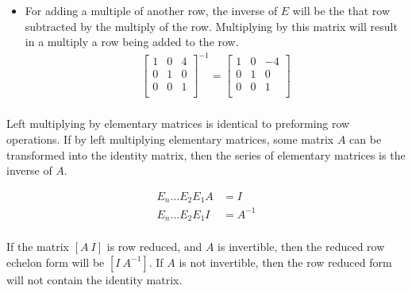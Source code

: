 \documentclass{article}
\theoremstyle{mytheoremstyle}
\theoremstyle{mytheoremstyle}
\theoremstyle{myproblemstyle}
\begin{document}
\begin{itemize}
        \item For adding a multiple of another row, the inverse of $E$ will be
            the that row subtracted by the multiply of the row. Multiplying by
            this matrix will result in a multiply a row being added to the row.
            \begin{align*}
                \begin{bmatrix}
                    1 & 0 & 4 \\
                    0 & 1 & 0 \\
                    0 & 0 & 1 \\
                \end{bmatrix}^{-1} = 
                \begin{bmatrix}
                    1 & 0 & -4 \\
                    0 & 1 & 0 \\
                    0 & 0 & 1 \\
                \end{bmatrix} \\
            \end{align*}
    \end{itemize}

    Left multiplying by elementary matrices is identical to preforming row
    operations. If by left multiplying elementary matrices, some matrix $A$ can
    be transformed into the identity matrix, then the series of elementary
    matrices is the inverse of $A$.

    \begin{align*}
        E_n \dots E_2E_1 A &= I \\
        E_n \dots E_2E_1 I &= A^{-1} \\
    \end{align*}

    If the matrix $[A\ I]$ is row reduced, and $A$ is invertible, then the
    reduced row echelon form will be $[I\ A^{-1}]$. If $A$ is not invertible,
    then the row reduced form will not contain the identity matrix.
\end{document}
